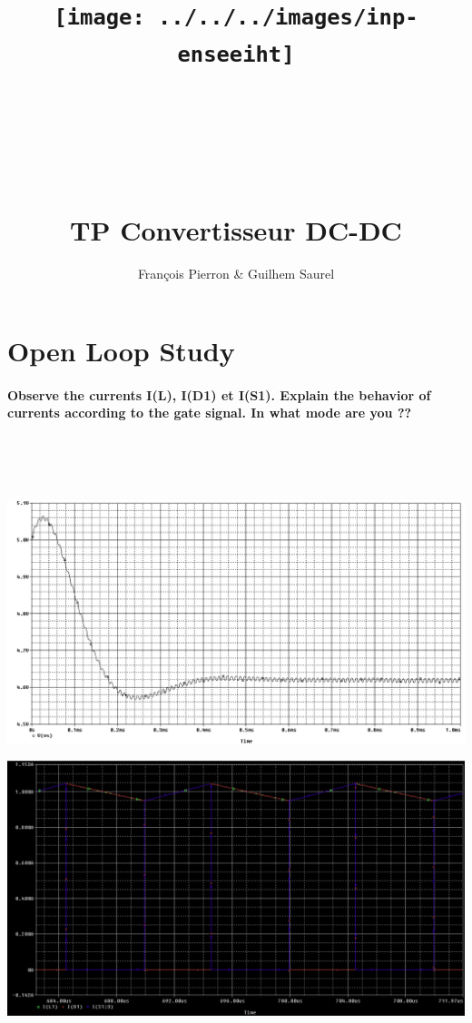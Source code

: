 \documentclass{article}
\title{\texttt{[image: ../../../images/inp-enseeiht]} \\ ~ \\ ~ \\ ~ \\ ~ \\ TP Convertisseur DC-DC}
\author{François Pierron \& Guilhem Saurel}
\date{\oldstylenums{\today}}
\begin{document}
\begin{titlepage}
    \setcounter{page}{0}
    \maketitle
    \vfill
    \tableofcontents
    \thispagestyle{empty}
\end{titlepage}


\section{Open Loop Study}

\paragraph{Observe the currents I(L), I(D1) et I(S1). Explain the behavior of currents according to the gate signal. In what mode are you ??}

~

~

\includegraphics[width=\linewidth]{vs.png}

\includegraphics[width=\linewidth]{courants.png}
\end{document}
